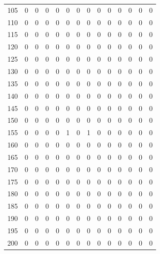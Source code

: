 \documentclass[preprint,12pt]{elsarticle}
\begin{document}
\begin{table}[ht]
\begin{tabular}{|c||rrr|r||rr|r||rr|r||rr|r|}
  105 &   0 &   0 &   0 &  0 &  0 &   0 &   0 &   0 &   0 &   0 &   0 &   0 &   0 \\ 
  110 &   0 &   0 &   0 &  0 &  0 &   0 &   0 &   0 &   0&   0 &   0 &   0  &   0 \\ 
  115 &   0 &   0 &   0 &  0 &  0 &   0 &   0 &   0 &   0 &   0 &   0 &   0 &   0 \\ 
  120 &   0 &   0 &   0 &  0 &  0 &   0 &   0 &   0 &   0 &   0 &   0 &   0 &   0 \\ 
  125 &   0 &   0 &   0 &  0 &  0 &   0 &   0 &   0 &   0 &   0 &   0 &   0 &   0 \\ 
  130 &   0 &   0 &   0 &  0 &  0 &   0 &   0 &   0 &   0 &   0 &   0 &   0 &   0 \\ 
  135 &   0 &   0 &   0 &  0 &  0 &   0 &   0 &   0 &   0 &   0 &   0 &   0 &   0 \\ 
  140 &   0 &   0 &   0 &  0 &  0 &   0 &   0 &   0 &   0 &   0 &   0 &   0 &   0 \\ 
  145 &   0 &   0 &   0 &  0 &  0 &   0 &   0 &   0 &   0 &   0 &   0 &   0 &   0 \\ 
  150 &   0 &   0 &   0 &  0 &  0 &   0 &   0 &   0 &   0 &   0 &   0 &   0 &   0 \\ 
  155 &   0 &   0 &   0 &  0 &  1 &   0 & 1 &  0 &   0 &   0 &   0 &   0 &   0 \\ 
  160 &   0 &   0 &   0 &  0 &  0 &   0 &   0 &   0 &   0 &   0 &   0 &   0 &   0 \\ 
  165 &   0 &   0 &   0 &  0 &  0 &   0 &   0 &   0 &   0 &   0 &   0 &   0 &   0 \\ 
  170 &   0 &   0 &   0 &  0 &  0 &   0 &   0 &   0 &   0 &   0 &   0 &   0 &   0 \\ 
  175 &   0 &   0 &   0 &   0 &  0 &   0 &   0 &   0 &   0 &   0 &   0 &   0 &   0 \\ 
  180 &   0 &   0 &   0 &  0 &   0 &   0 &   0 &   0 &   0 &   0 &   0 &   0 &   0 \\ 
  185 &   0 &   0 &   0 &  0 &   0 &   0 &   0 &   0 &   0 &   0 &   0 &   0 &   0 \\ 
  190 &   0 &   0 &   0 &  0 &   0 &   0 &   0 &   0 &   0 &   0 &   0 &   0 &   0 \\ 
  195 &   0 &   0 &   0 &   0 &  0 &   0 &   0 &   0 &   0 &   0 &   0 &   0 &   0 \\ 
  200 &   0 &   0 &   0 &   0 &  0 &   0 &   0 &   0 &   0 &   0 &   0 &   0 &   0 \\ 
   \hline
\end{tabular}
\end{table}
\end{document}
